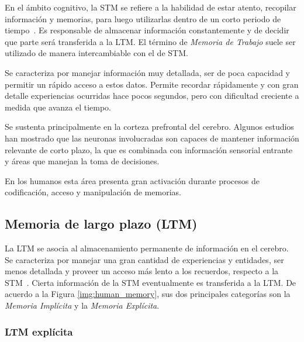 En el ámbito cognitivo, la STM se refiere a la habilidad de estar atento, recopilar información  y memorias, para luego utilizarlas dentro de un corto periodo de tiempo~\cite{Eichenbaum:2008}. Es responsable de almacenar información constantemente y de decidir que parte será transferida a la LTM. El término de \textit{Memoria de Trabajo} suele ser utilizado de manera intercambiable con el de STM.

Se caracteriza por manejar información muy detallada, ser de poca capacidad y permitir un rápido acceso a estos datos. Permite recordar rápidamente y con gran detalle experiencias ocurridas hace pocos segundos, pero con dificultad creciente a medida que avanza el tiempo.

Se sustenta principalmente en la corteza prefrontal del cerebro. Algunos estudios han mostrado que las neuronas involucradas son capaces de mantener información relevante de corto plazo, la que es combinada con información sensorial entrante y áreas que manejan la toma de decisiones. 

En los humanos esta área presenta gran activación durante procesos de codificación, acceso y manipulación de memorias.


\subsection{Memoria de largo plazo (LTM)}


La LTM se asocia al almacenamiento permanente de información en el cerebro. Se caracteriza por manejar una gran cantidad de experiencias y entidades, ser menos detallada y proveer un acceso más lento a los recuerdos, respecto a la STM~\cite{Eichenbaum:2008}. Cierta información de la STM eventualmente es transferida a la LTM. De acuerdo a la Figura \ref{img:human_memory}, sus dos principales categorías son la \textit{Memoria Implícita} y la \textit{Memoria Explícita}.


\subsubsection{LTM explícita}

